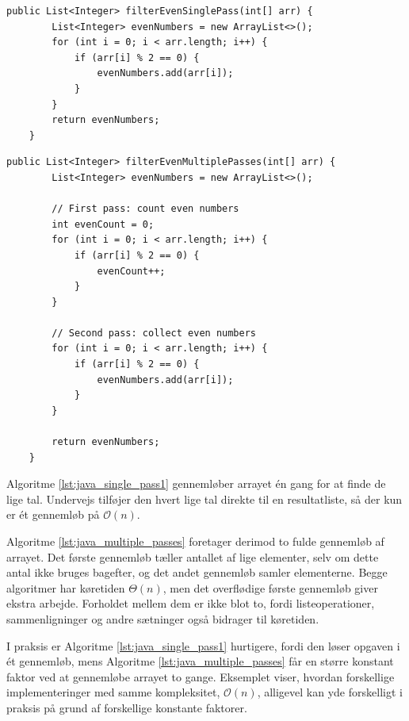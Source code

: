 \begin{lstlisting}[style=javaStyle, caption={Ét gennemløb til at filtrere lige tal}, label={lst:java_single_pass1}]
    public List<Integer> filterEvenSinglePass(int[] arr) {
        List<Integer> evenNumbers = new ArrayList<>();
        for (int i = 0; i < arr.length; i++) {
            if (arr[i] % 2 == 0) {
                evenNumbers.add(arr[i]);
            }
        }
        return evenNumbers;
    }
\end{lstlisting}

\newpage

\begin{lstlisting}[style=javaStyle, caption={Flere gennemløb til at filtrere lige tal}, label={lst:java_multiple_passes}]
    public List<Integer> filterEvenMultiplePasses(int[] arr) {
        List<Integer> evenNumbers = new ArrayList<>();

        // First pass: count even numbers
        int evenCount = 0;
        for (int i = 0; i < arr.length; i++) {
            if (arr[i] % 2 == 0) {
                evenCount++;
            }
        }

        // Second pass: collect even numbers
        for (int i = 0; i < arr.length; i++) {
            if (arr[i] % 2 == 0) {
                evenNumbers.add(arr[i]);
            }
        }

        return evenNumbers;
    }
\end{lstlisting}

Algoritme \ref{lst:java_single_pass1} gennemløber arrayet én gang for at finde de lige tal. Undervejs tilføjer den hvert lige tal direkte til en resultatliste, så der kun er ét gennemløb på $\mathcal{O}(n)$.

Algoritme \ref{lst:java_multiple_passes} foretager derimod to fulde gennemløb af arrayet. Det første gennemløb tæller antallet af lige elementer, selv om dette antal ikke bruges bagefter, og det andet gennemløb samler elementerne. Begge algoritmer har køretiden $\Theta(n)$, men det overflødige første gennemløb giver ekstra arbejde. Forholdet mellem dem er ikke blot to, fordi listeoperationer, sammenligninger og andre sætninger også bidrager til køretiden.

I praksis er Algoritme \ref{lst:java_single_pass1} hurtigere, fordi den løser opgaven i ét gennemløb, mens Algoritme \ref{lst:java_multiple_passes} får en større konstant faktor ved at gennemløbe arrayet to gange. Eksemplet viser, hvordan forskellige implementeringer med samme kompleksitet, $\mathcal{O}(n)$, alligevel kan yde forskelligt i praksis på grund af forskellige konstante faktorer.

